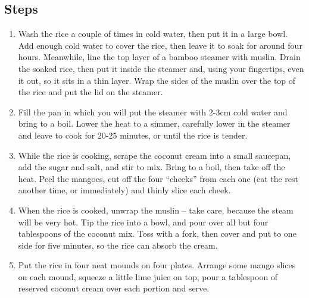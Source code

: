 \documentclass{book}
\begin{document}
\subsection*{Steps}
\begin{enumerate}
\item Wash the rice a couple of times in cold water, then put it in a large bowl. Add enough cold water to cover the rice, then leave it to soak for around four hours. Meanwhile, line the top layer of a bamboo steamer with muslin. Drain the soaked rice, then put it inside the steamer and, using your fingertips, even it out, so it sits in a thin layer. Wrap the sides of the muslin over the top of the rice and put the lid on the steamer.
\item Fill the pan in which you will put the steamer with 2-3cm cold water and bring to a boil. Lower the heat to a simmer, carefully lower in the steamer and leave to cook for 20-25 minutes, or until the rice is tender.
\item While the rice is cooking, scrape the coconut cream into a small saucepan, add the sugar and salt, and stir to mix. Bring to a boil, then take off the heat. Peel the mangoes, cut off the four “cheeks” from each one (eat the rest another time, or immediately) and thinly slice each cheek.
\item When the rice is cooked, unwrap the muslin – take care, because the steam will be very hot. Tip the rice into a bowl, and pour over all but four tablespoons of the coconut mix. Toss with a fork, then cover and put to one side for five minutes, so the rice can absorb the cream.
\item Put the rice in four neat mounds on four plates. Arrange some mango slices on each mound, squeeze a little lime juice on top, pour a tablespoon of reserved coconut cream over each portion and serve.
\end{enumerate}
\newpage
\end{document}
